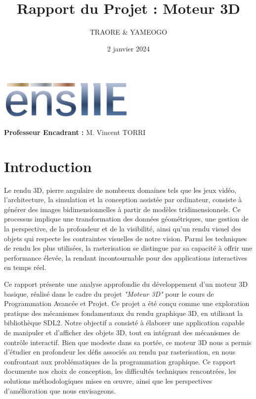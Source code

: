 \documentclass[12pt]{article}
\title{Rapport du Projet : Moteur 3D}
\author{TRAORE \& YAMEOGO}
\date{2 janvier 2024}
\begin{document}
\maketitle
\begin{center}
\includegraphics[width=0.5\textwidth]{logo.png}
\end{center}

\vspace{5cm}

\noindent\textbf{Professeur Encadrant :} M. Vincent TORRI

\newpage
\tableofcontents
\newpage

\section{Introduction}
\label{sec:introduction}

\noindent Le rendu 3D, pierre angulaire de nombreux domaines tels que les jeux vidéo, l'architecture, la simulation et la conception assistée par ordinateur, consiste à générer des images bidimensionnelles à partir de modèles tridimensionnels. Ce processus implique une transformation des données géométriques, une gestion de la perspective, de la profondeur et de la visibilité, ainsi qu'un rendu visuel des objets qui respecte les contraintes visuelles de notre vision.  Parmi les techniques de rendu les plus utilisées, la rasterisation se distingue par sa capacité à offrir une performance élevée, la rendant incontournable pour des applications interactives en temps réel.

\noindent Ce rapport présente une analyse approfondie du développement d'un moteur 3D basique, réalisé dans le cadre du projet \textit{"Moteur 3D"} pour le cours de Programmation Avancée et Projet. Ce projet a été conçu comme une exploration pratique des mécanismes fondamentaux du rendu graphique 3D, en utilisant la bibliothèque SDL2. Notre objectif a consisté à élaborer une application capable de manipuler et d'afficher des objets 3D, tout en intégrant des mécanismes de contrôle interactif. Bien que modeste dans sa portée, ce moteur 3D nous a permis d'étudier en profondeur les défis associés au rendu par rasterisation, en nous confrontant aux problématiques de la programmation graphique. Ce rapport documente nos choix de conception, les difficultés techniques rencontrées, les solutions méthodologiques mises en œuvre, ainsi que les perspectives d'amélioration que nous envisageons.
\end{document}
